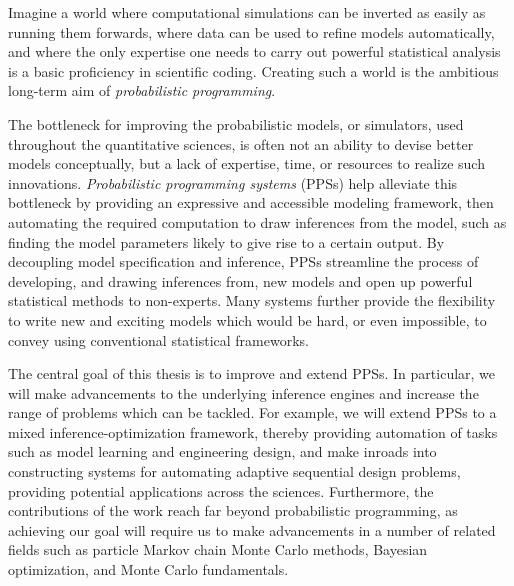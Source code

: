 
\vspace{20pt}
Imagine a world where computational simulations can be inverted as easily as running them forwards, where data
can be used to refine models automatically, and where the only expertise one needs to carry
out powerful statistical analysis is a basic proficiency in scientific coding.  Creating such a
world is the ambitious long-term aim of \emph{probabilistic programming}.

The bottleneck for improving the probabilistic models, or simulators, used throughout the quantitative sciences,
is often not an ability to devise better models conceptually,  but a lack of expertise,
time, or resources to realize such innovations.
\emph{Probabilistic programming systems} (PPSs) help alleviate this bottleneck 
by providing an expressive and accessible modeling framework,
 then
automating the required computation to draw inferences from the model, such as finding
the model parameters likely to give rise to a certain output.
By decoupling model specification and inference, PPSs 
streamline the process of developing, and drawing inferences from, new models
and open up powerful statistical methods to non-experts.
Many systems further provide
the flexibility to write new and exciting models which would be hard, or even impossible, to convey using 
conventional statistical frameworks.

The central goal of this thesis is to improve and extend PPSs.
In particular, we will
make advancements to the underlying inference engines and increase the
range of problems which can be tackled.  For example, we will extend PPSs to a mixed inference-optimization
framework, thereby providing automation of tasks
such as model learning and engineering design, and make inroads into constructing systems
for automating adaptive sequential design problems, providing potential applications across the sciences.
Furthermore, the contributions of the work reach far beyond probabilistic programming, as 
achieving our goal will require us to make
advancements in a number of related fields such as particle Markov chain Monte Carlo methods,
Bayesian optimization, and Monte Carlo fundamentals. %

